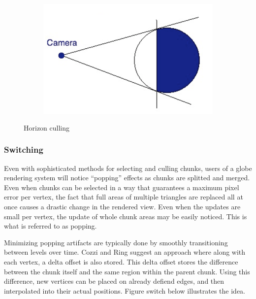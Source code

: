 \begin{figure}[htbp]
    \centering
    \begin{subfigure}[bt]{0.4\textwidth}
        \includegraphics[width=\textwidth]{figures/chunkedlod/horizonculling.png}
    \end{subfigure}
    \caption{Horizon culling}
    \label{fig:horizonculling}
\end{figure}


\subsubsection{Switching}
Even with sophisticated methods for selecting and culling chunks, users of a globe rendering system will notice ``popping'' effects as chunks are splitted and merged. Even when chunks can be selected in a way that guarantees a maximum pixel error per vertex, the fact that full areas of multiple triangles are replaced all at once causes a drastic change in the rendered view. Even when the updates are small per vertex, the update of whole chunk areas may be easily noticed. This is what is referred to as popping.

Minimizing popping artifacts are typically done by smoothly transitioning between levels over time. Cozzi and Ring suggest an approach where along with each vertex, a delta offset is also stored\cite[p. 451]{cozzi11}. This delta offset stores the difference between the chunk itself and the same region within the parent chunk. Using this difference, new vertices can be placed on already defiend edges, and then interpolated into their actual positions. Figure switch below illustrates the idea.

